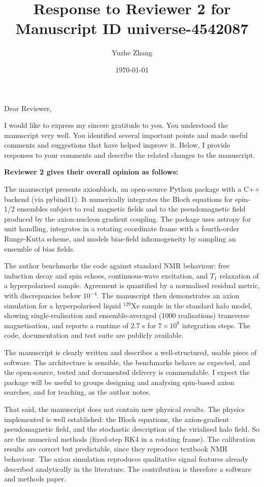 \documentclass{article}
\newcommand{\refereeOverallComment}[2]{
  \noindent \textbf{Reviewer #1 gives their overall opinion as follows:}
  \begin{mdframed}[linecolor=black]
  #2
  \end{mdframed}
}
\begin{document}
\title{Response to Reviewer 2 for Manuscript ID universe-4542087}

\date{\today}
\author{Yuzhe Zhang}

\maketitle

\noindent Dear Reviewer,
 
I would like to express my sincere gratitude to you. 
You understood the manuscript very well. 
You identified several important points and made useful comments and suggestions that have helped improve it. 
Below, I provide responses to your comments and describe the related changes to the manuscript.



\refereeOverallComment{2}{
    The manuscript presents axionbloch, an open-source Python package with a C++ backend (via pybind11). It numerically integrates the Bloch equations for spin-1/2 ensembles subject to real magnetic fields and to the pseudomagnetic field produced by the axion-nucleon gradient coupling. The package uses astropy for unit handling, integrates in a rotating coordinate frame with a fourth-order Runge-Kutta scheme, and models bias-field inhomogeneity by sampling an ensemble of bias fields.

    The author benchmarks the code against standard NMR behaviour: free induction decay and spin echoes, continuous-wave excitation, and $T_1$ relaxation of a hyperpolarised sample. Agreement is quantified by a normalised residual metric, with discrepancies below $10^{-4}$. The manuscript then demonstrates an axion simulation for a hyperpolarised liquid $^{129}$Xe sample in the standard halo model, showing single-realisation and ensemble-averaged (1000 realisations) transverse magnetisation, and reports a runtime of 2.7 s for $7\times 10^8$ integration steps. The code, documentation and test suite are publicly available.

    The manuscript is clearly written and describes a well-structured, usable piece of software. The architecture is sensible, the benchmarks behave as expected, and the open-source, tested and documented delivery is commendable. I expect the package will be useful to groups designing and analysing spin-based axion searches, and for teaching, as the author notes.

    That said, the manuscript does not contain new physical results. The physics implemented is well established: the Bloch equations, the axion-gradient pseudomagnetic field, and the stochastic description of the virialised halo field. So are the numerical methods (fixed-step RK4 in a rotating frame). The calibration results are correct but predictable, since they reproduce textbook NMR behaviour. The axion simulation reproduces qualitative signal features already described analytically in the literature. The contribution is therefore a software and methods paper.

}
\end{document}
